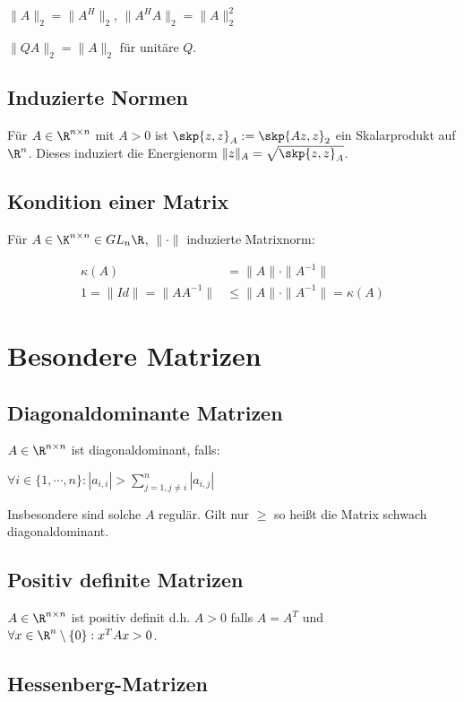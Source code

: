 $\|A\|_2 = \|A^H\|_2$, $\|A^H A\|_2 = \|A\|_2^2$

$\|Q A\|_2 = \|A\|_2$ für unitäre $Q$.

\subsection*{Induzierte Normen}

Für $A \in \R^{n \times n}$ mit $A > 0$ ist $\skp{z,z}_A := \skp{Az,z}_2$ ein Skalarprodukt auf $\R^n$. Dieses induziert die Energienorm $\|z\|_A = \sqrt{\skp{z,z}_A}$.

\subsection*{Kondition einer Matrix}

Für $A \in \K^{n \times n} \in GL_n{\R}$, $\|\cdot\|$ induzierte Matrixnorm:

\vspace*{-4mm}
\begin{align*}
\kappa(A) &= \|A\| \cdot \|A^{-1}\| \\
1 = \|Id\| = \|AA^{-1}\| &\leq \|A\| \cdot \|A^{-1}\| = \kappa(A)
\end{align*}

\section*{Besondere Matrizen}

\subsection*{Diagonaldominante Matrizen}

$A \in \R^{n \times n}$ ist diagonaldominant, falls:

$\forall i \in \{1,\cdots,n\} : |a_{i,i}| > \sum_{j=1,j\neq i}^n |a_{i,j}|$

Insbesondere sind solche $A$ regulär. Gilt nur $\geq$ so heißt die Matrix schwach diagonaldominant.

\subsection*{Positiv definite Matrizen}

$A \in \R^{n \times n}$ ist positiv definit d.h. $A > 0$ falls $A=A^T$ und $\forall x \in \R^n \setminus \{0\} : x^TAx > 0$.

\subsection*{Hessenberg-Matrizen}

